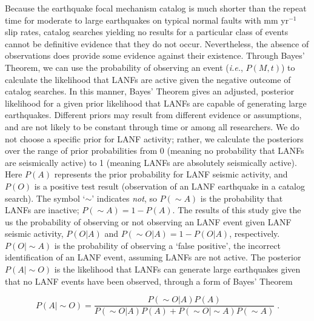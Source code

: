 \documentclass[draft,grl]{AGUTeX}
\begin{document}
\begin{article}
Because the earthquake focal mechanism catalog is much shorter than the repeat
time for moderate to large earthquakes on typical normal faults with mm
yr$^{-1}$ slip rates, catalog searches yielding no results for a particular
class of events cannot be definitive evidence that they do not occur.
Nevertheless, the absence of observations does provide some evidence against
their existence. Through Bayes' Theorem, we can use the probability of
observing an event (\emph{i.e.}, $P(M,t)$) to calculate the likelihood that
LANFs are active given the negative outcome of catalog searches. In this
manner, Bayes' Theorem gives an adjusted, posterior likelihood for a given
prior likelihood that LANFs are capable of generating large earthquakes.
Different priors may result from different evidence or assumptions, and are not
likely to be constant through time or among all researchers. We do not choose
a specific prior for LANF activity; rather, we calculate the posteriors over
the range of prior probabilities from 0 (meaning no probability that LANFs are
seismically active) to 1 (meaning LANFs are absolutely seismically active).
Here $P(A)$ represents the prior probability for LANF seismic activity, and
$P(O)$ is a positive test result (observation of an LANF earthquake in
a catalog search).  The symbol `$\sim$' indicates \emph{not}, so $P(\sim A)$ is
the probability that LANFs are inactive;  $ P(\sim A) = 1 - P(A)$.  The results
of this study give the us the probability of observing or not observing an LANF
event given LANF seismic activity, $P(O|A)$ and $P(\sim O | A) = 1 - P(O|A)$,
respectively. $P(O | \sim A)$ is the probability of observing a `false
positive', the incorrect identification of an LANF event, assuming LANFs are
not active.  The posterior $P(A |\sim O)$ is the likelihood that LANFs can
generate large earthquakes given that no LANF events have been observed,
through a form of Bayes' Theorem

\begin{equation}
P(A | \sim O) = \frac{P(\sim O|A) P(A)}
{P(\sim O|A)P(A) + P(\sim O|\sim A)P(\sim A)} \;.
\label{BayesRule}
\end{equation}


\end{article}
\end{document}

